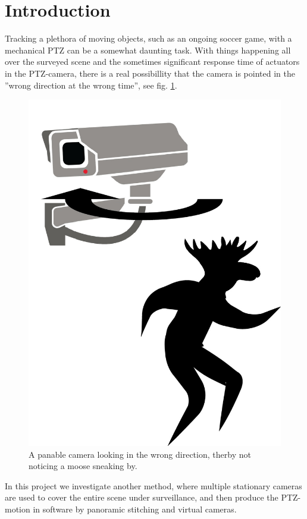 \section{Introduction}


Tracking a plethora of moving objects, such as an ongoing soccer game, with a mechanical PTZ can be a somewhat daunting task. With things happening all over the surveyed scene and the sometimes significant response time of actuators in the PTZ-camera, there is a real possibillity that the camera is pointed in the ''wrong direction at the wrong time'', see fig. \ref{fig:problem}.

\begin{figure}[H]
	\centering
	\includegraphics[width=0.5 \columnwidth]{../results/images/PTZ_problem.jpg}
	\caption{A panable camera looking in the wrong direction, therby not noticing a moose sneaking by.}
	\label{fig:problem}
\end{figure}

In this project we investigate another method, where multiple stationary cameras are used to cover the entire scene under surveillance, and then produce the PTZ-motion in software by panoramic stitching and virtual cameras.
